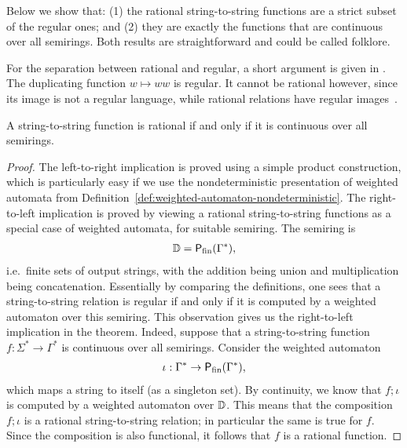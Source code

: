 Below we show that: (1) the rational string-to-string functions are a strict subset of the regular ones; and (2) they are exactly the functions that are continuous over all semirings. Both results are straightforward and could be called folklore.

\begin{myexample}
    For the separation between rational and regular, a short argument is given in \cite[p. 218]{engelfrietMSODefinableString2001}. The duplicating function $w \mapsto ww$ is regular. It cannot be rational however, since its image is not a regular language, while rational relations have regular images~\cite[Theorem IX.3.1]{Eilenberg74}.
\end{myexample}





\begin{theorem}\label{thm:rational-functions}
    A string-to-string function is rational if and only if it is continuous over all semirings.
\end{theorem}
\begin{proof}
    The left-to-right implication is proved using a simple product construction, which is particularly easy if we use the nondeterministic presentation of weighted automata from Definition~\ref{def:weighted-automaton-nondeterministic}. The right-to-left implication is proved by viewing a rational string-to-string functions as a special case of weighted automata, for suitable semiring. The semiring is 
    \begin{align*}
    \mathbb D = \mathsf{P}_{\mathrm{fin}}(\Gamma^*),
    \end{align*}
    i.e.~finite sets of output strings, with the addition being union and multiplication being concatenation. Essentially by comparing the definitions, one sees that a string-to-string relation is regular if and only if it is computed by a weighted automaton over this semiring. This observation gives us the right-to-left implication in the theorem. Indeed, suppose that a string-to-string function $f : \Sigma^* \to \Gamma^*$ is continuous over all semirings. Consider the weighted automaton 
    \begin{align*}
    \iota : \Gamma^* \to \mathsf{P}_{\mathrm{fin}}(\Gamma^*),
    \end{align*}
    which maps a string to itself (as a singleton set). By continuity, we know that $f; \iota$ is computed by a weighted automaton over $\mathbb D$. This means that the composition $f;\iota$ is a rational string-to-string relation; in particular the same is true for $f$. Since the composition is also functional, it follows that $f$ is a rational function. 
\end{proof}


